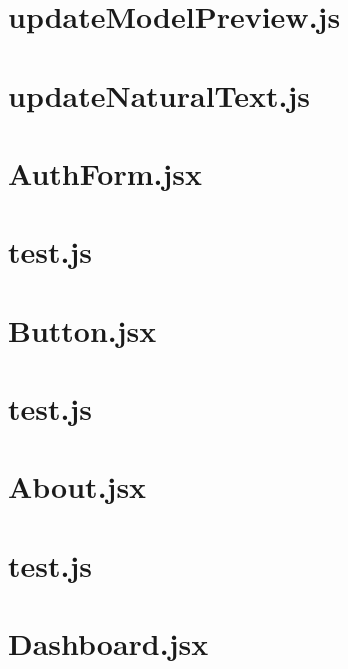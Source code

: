 \documentclass[a4paper,landscape]{report}
\begin{document}
\newpage
\section{updateModelPreview.js}


\newpage
\section{updateNaturalText.js}


\newpage
\section{AuthForm.jsx}


\newpage
\section{test.js}


\newpage
\section{Button.jsx}


\newpage
\section{test.js}


\newpage
\section{About.jsx}


\newpage
\section{test.js}


\newpage
\section{Dashboard.jsx}

\end{document}
